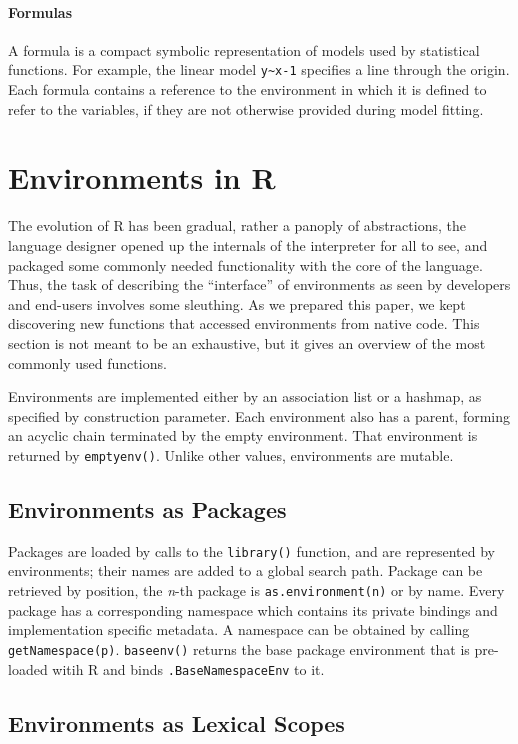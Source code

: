 \documentclass[10pt,review,sigplan,authorversion=true]{acmart}
\newcommand{\code}[1]{\lstinline |#1|\xspace}
\begin{document}
\paragraph{Formulas}  A formula is a compact symbolic representation of models
used by statistical functions. For example, the linear model \code{y~x-1}
specifies a line through the origin. Each formula contains a reference to the
environment in which it is defined to refer to the variables, if they are not
otherwise provided during model fitting.

\section{Environments in R}

The evolution of R has been gradual, rather a panoply of abstractions, the
language designer opened up the internals of the interpreter for all to see, and
packaged some commonly needed functionality with the core of the language. Thus,
the task of describing the ``interface'' of environments as seen by developers
and end-users involves some sleuthing. As we prepared this paper, we kept
discovering new functions that accessed environments from native code. This
section is not meant to be an exhaustive, but it gives an overview of the most
commonly used functions.

Environments are implemented either by an association list or a hashmap, as
specified by construction parameter. Each environment also has a parent, forming
an acyclic chain terminated by the empty environment. That environment is
returned by \code{emptyenv()}. Unlike other values, environments are mutable.

\subsection{Environments as Packages}

Packages are loaded by calls to the \code{library()} function, and are
represented by environments; their names are added to a global search path.
Package can be retrieved by position, the \emph{n}-th package is
\code{as.environment(n)} or by name. Every package has a corresponding namespace
which contains its private bindings and implementation specific metadata. A
namespace can be obtained by calling \code{getNamespace(p)}. \code{baseenv()}
returns the base package environment that is pre-loaded witih R and binds
\code{.BaseNamespaceEnv} to it.


\subsection{Environments as Lexical Scopes}
\end{document}
